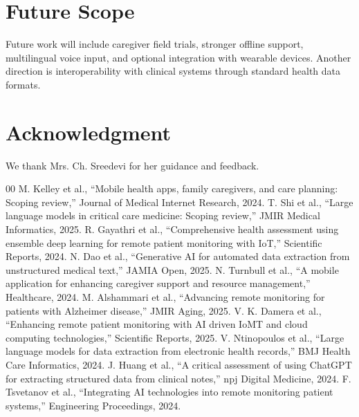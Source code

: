 \documentclass[conference]{IEEEtran}
\begin{document}
\section{Future Scope}
Future work will include caregiver field trials, stronger offline support, multilingual voice input, and optional integration with wearable devices. Another direction is interoperability with clinical systems through standard health data formats.

\section*{Acknowledgment}
We thank Mrs. Ch. Sreedevi for her guidance and feedback.

\begin{thebibliography}{00}
 M. Kelley et al., ``Mobile health apps, family caregivers, and care planning: Scoping review,'' Journal of Medical Internet Research, 2024.
 T. Shi et al., ``Large language models in critical care medicine: Scoping review,'' JMIR Medical Informatics, 2025.
 R. Gayathri et al., ``Comprehensive health assessment using ensemble deep learning for remote patient monitoring with IoT,'' Scientific Reports, 2024.
 N. Dao et al., ``Generative AI for automated data extraction from unstructured medical text,'' JAMIA Open, 2025.
 N. Turnbull et al., ``A mobile application for enhancing caregiver support and resource management,'' Healthcare, 2024.
 M. Alshammari et al., ``Advancing remote monitoring for patients with Alzheimer disease,'' JMIR Aging, 2025.
 V. K. Damera et al., ``Enhancing remote patient monitoring with AI driven IoMT and cloud computing technologies,'' Scientific Reports, 2025.
 V. Ntinopoulos et al., ``Large language models for data extraction from electronic health records,'' BMJ Health Care Informatics, 2024.
 J. Huang et al., ``A critical assessment of using ChatGPT for extracting structured data from clinical notes,'' npj Digital Medicine, 2024.
 F. Tsvetanov et al., ``Integrating AI technologies into remote monitoring patient systems,'' Engineering Proceedings, 2024.
\end{thebibliography}
\end{document}
